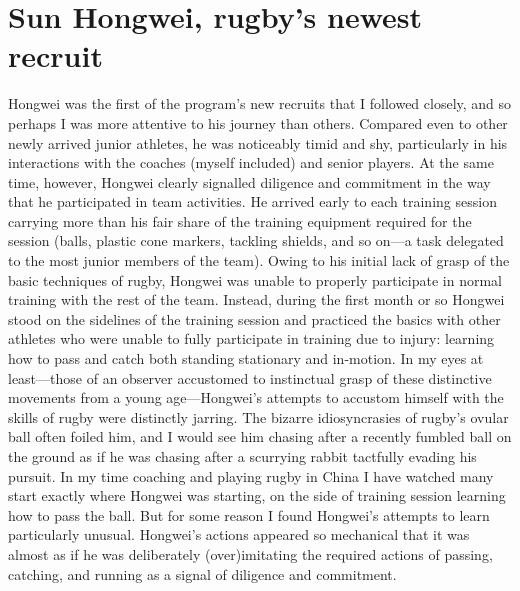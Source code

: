 \section{Sun Hongwei, rugby's newest recruit}
Hongwei was the first of the program’s new recruits that I followed closely, and so perhaps I was more attentive to his journey than others.  Compared even to other newly arrived junior athletes, he was noticeably timid and shy, particularly in his interactions with the coaches (myself included) and senior players.   At the same time, however, Hongwei clearly signalled diligence and commitment in the way that he participated in team activities.  He arrived early to each training session carrying more than his fair share of the training equipment required for the session (balls, plastic cone markers, tackling shields, and so on---a task delegated to the most junior members of the team).  Owing to his initial lack of grasp of the basic techniques of rugby, Hongwei was unable to properly participate in normal training with the rest of the team. Instead, during the first month or so Hongwei stood on the sidelines of the training session and practiced the basics with other athletes who were unable to fully participate in training due to injury: learning how to pass and catch both standing stationary and in-motion. In my eyes at least---those of an observer accustomed to instinctual grasp of these distinctive movements from a young age---Hongwei's attempts to accustom himself with the skills of rugby were distinctly jarring.  The bizarre idiosyncrasies of rugby's ovular ball often foiled him, and I would see him chasing after a recently fumbled ball on the ground as if he was chasing after a scurrying rabbit tactfully evading his pursuit.  In my time coaching and playing rugby in China I have watched many start exactly where Hongwei was starting, on the side of training session learning how to pass the ball.  But for some reason I found Hongwei’s attempts to learn particularly unusual.  Hongwei's actions appeared so mechanical that it was almost as if he was deliberately (over)imitating the required actions of passing, catching, and running as a signal of diligence and commitment.


